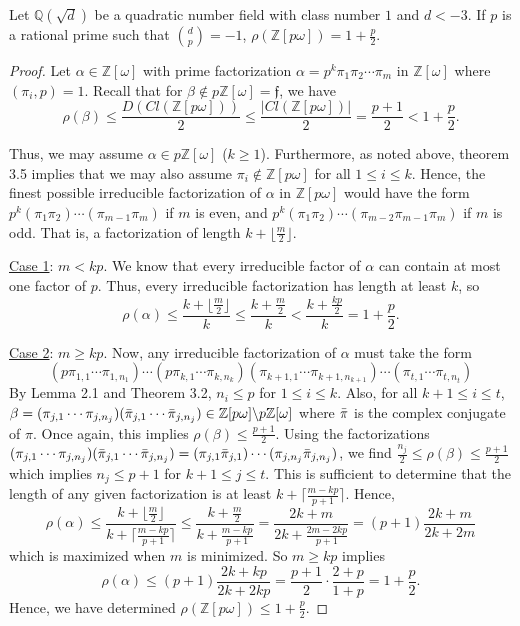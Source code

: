 \documentclass[10pt,a4paper]{amsart}
\newcommand{\bbq}{\mathbb{Q}}
\newcommand{\bbz}{\mathbb{Z}}
\renewcommand{\geq}{\geqslant}
\renewcommand{\leq}{\leqslant}
\begin{document}
\begin{thm}
    Let $\bbq(\sqrt{d})$ be a quadratic number field with class number $1$ and $d < -3$. If $p$ is a rational prime such that $\binom{d}{p} = -1$, $\rho(\bbz[p\omega]) = 1 + \frac{p}{2}$.
\end{thm}

\begin{proof}
    Let $\alpha \in \bbz[\omega]$ with prime factorization $\alpha = p^k \pi_1 \pi_2 \dotsm \pi_m$ in $\bbz[\omega]$ where $(\pi_i, p) = 1$. Recall that for $\beta \notin p\bbz[\omega] = \mathfrak{f}$, we have 
    \[
    \rho(\beta) \leq \frac{D(Cl(\bbz[p\omega]))}{2} \leq \frac{|Cl(\bbz[p\omega])|}{2}=\frac{p+1}{2} < 1 + \frac{p}{2}.
    \]

    Thus, we may assume $\alpha \in p\bbz[\omega]$ ($k \geq 1$). Furthermore, as noted above, theorem 3.5 implies that we may also assume $\pi_i \notin \bbz[p\omega]$ for all $1 \leq i \leq k$. Hence, the finest possible irreducible factorization of $\alpha$ in $\bbz[p\omega]$ would have the form $p^k(\pi_1 \pi_2) \dotsm (\pi_{m-1}\pi_m)$ if $m$ is even, and $p^k(\pi_1 \pi_2) \dotsm (\pi_{m-2} \pi_{m-1}\pi_m)$ if $m$ is odd. That is, a factorization of length $k + \lfloor \frac{m}{2} \rfloor$.

    \underline{Case 1}: $m < kp$. We know that every irreducible factor of $\alpha$ can contain at most one factor of $p$. Thus, every irreducible factorization has length at least $k$, so 
    \[
    \rho(\alpha) \leq \frac{k + \lfloor \frac{m}{2} \rfloor}{k} \leq \frac{k + \frac{m}{2}}{k} < \frac{k + \frac{kp}{2}}{k} = 1 + \frac{p}{2}.
    \]
    
    \underline{Case 2}: $m \geq kp$. Now, any irreducible factorization of $\alpha$ must take the form 
    \[
    (p \pi_{1,1} \dotsm \pi_{1,n_1})\dotsm (p \pi_{k,1} \dotsm \pi_{k,n_k}) ( \pi_{k+1,1} \dotsm \pi_{k+1,n_{k+1}}) \dotsm ( \pi_{t,1} \dotsm \pi_{t,n_t}) 
    \]
    By Lemma 2.1 and Theorem 3.2, $n_i \leq p$ for $1 \leq i \leq k$. Also, for all $k + 1 \leq i \leq t$, $\beta = ( \pi_{j,1} \dotsm \pi_{j,n_{j}}) ( \Bar{\pi}_{j,1} \dotsm \Bar{\pi}_{j,n_j}) \in \bbz[p\omega] \backslash p\bbz[\omega]$ where $\Bar{\pi}$ is the complex conjugate of $\pi$. Once again, this implies $\rho(\beta) \leq \frac{p + 1}{2}$. Using the factorizations $( \pi_{j,1} \dotsm \pi_{j,n_{j}}) ( \Bar{\pi}_{j,1} \dotsm \Bar{\pi}_{j,n_j}) = (\pi_{j,1} \Bar{\pi}_{j,1}) \dotsm (\pi_{j,n_j} \Bar{\pi}_{j,n_j})$, we find $\frac{n_j}{2} \leq \rho(\beta) \leq \frac{p+1}{2}$ which implies $ n_j \leq p + 1$ for $k+1 \leq j \leq t$. This is sufficient to determine that the length of any given factorization is at least $k + \lceil \frac{m-kp}{p+1} \rceil$. Hence,
    \[
    \rho(\alpha) \leq \frac{k + \lfloor \frac{m}{2} \rfloor}{k + \lceil \frac{m-kp}{p+1} \rceil} \leq \frac{k + \frac{m}{2}}{k + \frac{m-kp}{p+1}} = \frac{2k + m}{2k + \frac{2m - 2kp}{p+1}} = (p+1)\frac{2k+m}{2k+2m} 
    \]
     which is maximized when $m$ is minimized. So $m \geq kp$ implies
    \[
    \rho(\alpha) \leq (p+1)\frac{2k+kp}{2k+2kp}=\frac{p+1}{2}\cdot\frac{2+p}{1+p} = 1 + \frac{p}{2}.
    \]
    Hence, we have determined $\rho(\bbz[p\omega]) \leq 1 + \frac{p}{2}$. 
    

\end{proof}
\end{document}
